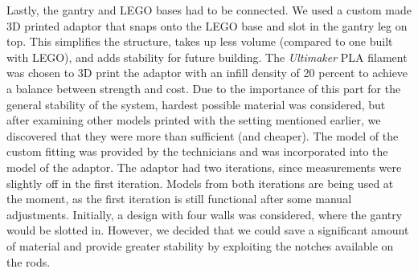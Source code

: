 \documentclass{article}
\begin{document}
Lastly, the gantry and LEGO bases had to be connected. We used a custom made 3D printed adaptor that snaps onto the LEGO base and slot in the gantry leg on top. This simplifies the structure, takes up less volume (compared to one built with LEGO), and adds stability for future building. The \textit{Ultimaker} PLA filament was chosen to 3D print the adaptor with an infill density of 20 percent to achieve a balance between strength and cost. Due to the importance of this part for the general stability of the system, hardest possible material was considered, but after examining other models printed with the setting mentioned earlier, we discovered that they were more than sufficient (and cheaper). The model of the custom fitting was provided by the technicians and was incorporated into the model of the adaptor. The adaptor had two iterations, since measurements were slightly off in the first iteration. Models from both iterations are being used at the moment, as the first iteration is still functional after some manual adjustments. Initially, a design with four walls was considered, where the gantry would be slotted in. However, we decided that we could save a significant amount of material and provide greater stability by exploiting the notches available on the rods. \\
\label{sec:stages}
\end{document}
